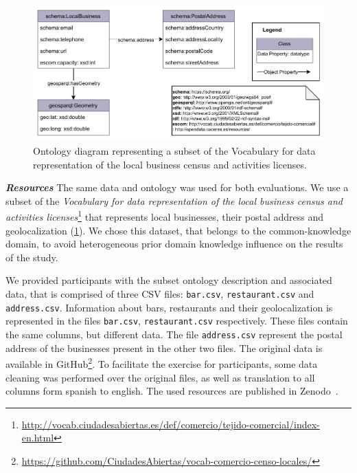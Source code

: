 \begin{figure}[!t]
\centering
\includegraphics[width=\linewidth]{figures/chp5-1_us_onto.pdf}
\caption[Ontology diagram for the user study exercise of Mapeathor]{Ontology diagram representing a subset of the Vocabulary for data representation of the local business census and activities licenses.}
\label{fig:chp5-1_us_onto}
\end{figure}

\noindent\textit{\textbf{Resources}}
The same data and ontology was used for both evaluations. We use a subset of the \textit{Vocabulary for data representation of the local business census and activities licenses}\footnote{\url{http://vocab.ciudadesabiertas.es/def/comercio/tejido-comercial/index-en.html}} that represents local businesses, their postal address and geolocalization (\cref{fig:chp5-1_us_onto}). 
We chose this dataset, that belongs to the common-knowledge domain, to avoid heterogeneous prior domain knowledge influence on the results of the study.

We provided participants with the subset ontology description and associated data, that is comprised of three CSV files: \texttt{bar.csv}, \texttt{restaurant.csv} and \texttt{address.csv}. Information about bars, restaurants and their geolocalization is represented in the files \texttt{bar.csv}, \texttt{restaurant.csv} respectively. 
These files contain the same columns, but different data. The file \texttt{address.csv} represent the postal address of the businesses present in the other two files. 
The original data is available in GitHub\footnote{\url{https://github.com/CiudadesAbiertas/vocab-comercio-censo-locales/}}. 
To facilitate the exercise for participants, some data cleaning was performed over the original files, as well as translation to all columns form spanish to english. The used resources are published in Zenodo~\citep{iglesias-molina_2022_8154522}.



